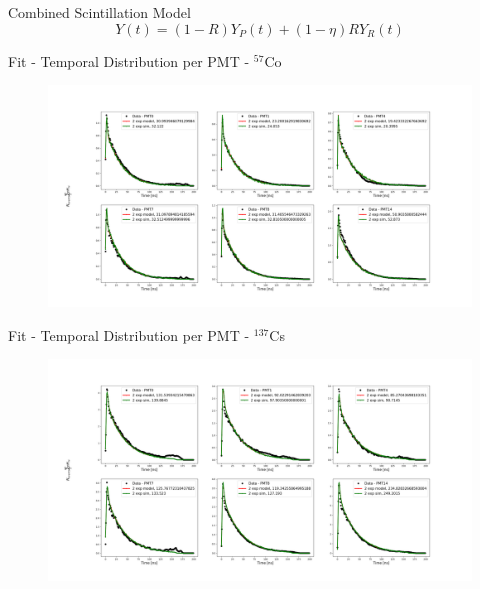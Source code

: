 \documentclass{beamer}
\begin{document}
\begin{frame}{Combined Scintillation Model}
\begin{equation}
Y(t)=(1-R)Y_P(t)+(1-\eta)RY_R(t)
\end{equation}
\end{frame}

\begin{frame}{Fit - Temporal Distribution per PMT - $^{57}$Co}
\begin{figure}[h]
\centering
\includegraphics[width=1\textwidth]{Co576PMTs.png}
\end{figure}
\end{frame}

\begin{frame}{Fit - Temporal Distribution per PMT - $^{137}$Cs}
\begin{figure}[h]
\centering
\includegraphics[width=1\textwidth]{Cs1376PMTs.png}
\end{figure}
\end{frame}
\end{document}
